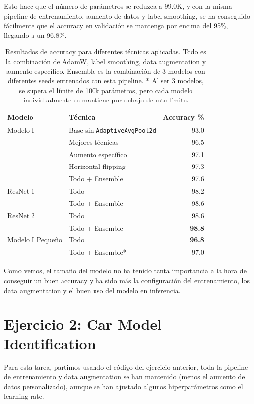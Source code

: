 \documentclass[11pt,spanish,listoffigures,listoftables]{tfgetsinf}
\begin{document}
Esto hace que el número de parámetros se reduzca a 99.0K, y con la misma pipeline de entrenamiento, aumento de datos y label smoothing, se ha conseguido fácilmente que el accuracy en validación se mantenga por encima del 95\%, llegando a un 96.8\%.

\begin{table}[H]
\centering
\begin{tabular}{llr}
	\toprule
	\textbf{Modelo} & \textbf{Técnica} & \textbf{Accuracy \%} \\
	\midrule
  Modelo I & Base sin \texttt{AdaptiveAvgPool2d} & 93.0 \\
	& Mejores técnicas & 96.5 \\
  & Aumento específico & 97.1 \\
  & Horizontal flipping & 97.3 \\
  & Todo + Ensemble & 97.6 \\
	\midrule
  ResNet 1 & Todo & 98.2 \\
  & Todo + Ensemble & 98.6 \\
  ResNet 2 & Todo & 98.6 \\
  & Todo + Ensemble & \textbf{98.8} \\
	\midrule
  Modelo I Pequeño & Todo & \textbf{96.8} \\
  & Todo + Ensemble* & 97.0 \\
	\bottomrule
\end{tabular}
\caption{Resultados de accuracy para diferentes técnicas aplicadas. Todo es la combinación de AdamW, label smoothing, data augmentation y aumento específico. Ensemble es la combinación de 3 modelos con diferentes seeds entrenados con esta pipeline. * Al ser 3 modelos, se supera el límite de 100k parámetros, pero cada modelo individualmente se mantiene por debajo de este límite.}
\label{tab:accuracy_ej1}
\end{table}

Como vemos, el tamaño del modelo no ha tenido tanta importancia a la hora de conseguir un buen accuracy y ha sido más la configuración del entrenamiento, los data augmentation y el buen uso del modelo en inferencia.


\section{Ejercicio 2: Car Model Identification}
Para esta tarea, partimos usando el código del ejercicio anterior, toda la pipeline de entrenamiento y data augmentation se han mantenido (menos el aumento de datos personalizado), aunque se han ajustado algunos hiperparámetros como el learning rate.
\end{document}
